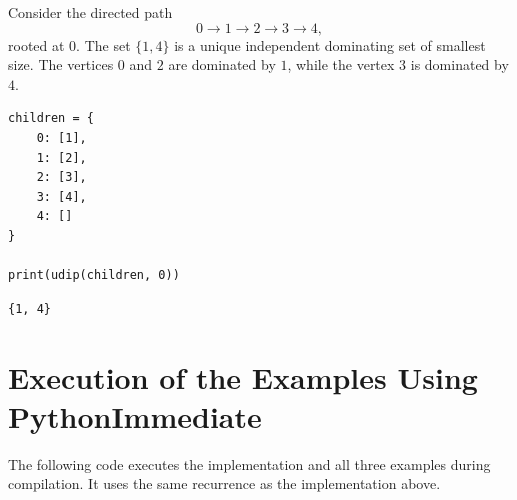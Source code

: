 \documentclass[ a4paper, 11pt]{report}
\theoremstyle{plain}
\theoremstyle{definition}
\begin{document}
Consider the directed path
$$
0\rightarrow 1\rightarrow 2\rightarrow 3\rightarrow 4,
$$
rooted at $0$. The set $\{1,4\}$ is a unique independent dominating set of smallest size. The vertices $0$ and $2$ are dominated by $1$, while the vertex $3$ is dominated by $4$. 

\begin{verbatim}
children = {
    0: [1],
    1: [2],
    2: [3],
    3: [4],
    4: []
}

print(udip(children, 0))
\end{verbatim}



\begin{verbatim}
{1, 4}
\end{verbatim}


\section{Execution of the Examples Using PythonImmediate}

The following code executes the implementation and all three examples during compilation. It uses the same recurrence as the implementation above. 
\end{document}
